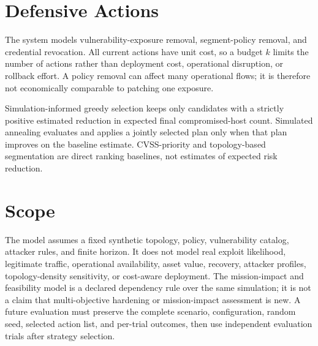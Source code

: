 \section{Defensive Actions}

The system models vulnerability-exposure removal, segment-policy removal, and credential revocation. All current actions have unit cost, so a budget $k$ limits the number of actions rather than deployment cost, operational disruption, or rollback effort. A policy removal can affect many operational flows; it is therefore not economically comparable to patching one exposure.

Simulation-informed greedy selection keeps only candidates with a strictly positive estimated reduction in expected final compromised-host count. Simulated annealing evaluates and applies a jointly selected plan only when that plan improves on the baseline estimate. CVSS-priority and topology-based segmentation are direct ranking baselines, not estimates of expected risk reduction.

\section{Scope}

The model assumes a fixed synthetic topology, policy, vulnerability catalog, attacker rules, and finite horizon. It does not model real exploit likelihood, legitimate traffic, operational availability, asset value, recovery, attacker profiles, topology-density sensitivity, or cost-aware deployment. The mission-impact and feasibility model is a declared dependency rule over the same simulation; it is not a claim that multi-objective hardening or mission-impact assessment is new. A future evaluation must preserve the complete scenario, configuration, random seed, selected action list, and per-trial outcomes, then use independent evaluation trials after strategy selection.
